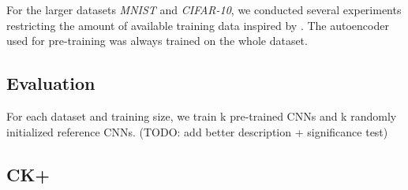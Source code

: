 \documentclass{article}
\begin{document}
    For the larger datasets \emph{MNIST} and \emph{CIFAR-10}, we conducted several experiments restricting the amount of available training data inspired by \citep{masci11}. The autoencoder used for pre-training was always trained on the whole dataset. 


  \subsection{Evaluation}
    For each dataset and training size, we train k pre-trained CNNs and k randomly initialized reference CNNs.
    (TODO: add better description + significance test)

  \subsection{CK+}
\end{document}
